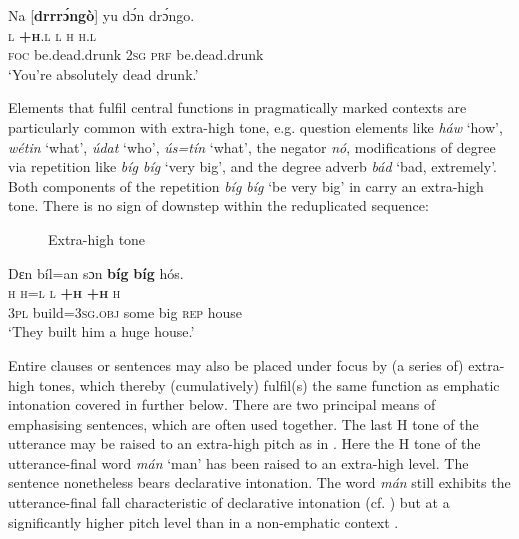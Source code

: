 \ea%
    \label{ex:key:62}
    \glll   Na  [\textbf{drrrɔ́ngò}]    yu  dɔ́n  drɔ́ngo. \\
\textsc{l}  \textbf{\textsc{+h}}\textsc{.l}        \textsc{l}  \textsc{h}  \textsc{h.l}\\
\textsc{foc}  be.dead.drunk  \textsc{2sg}  \textsc{prf}  be.dead.drunk\\
\glt ‘You’re absolutely dead drunk.’     
\z

Elements that fulfil central functions in pragmatically marked contexts are particularly common with extra-high tone, e.g. question elements like \textit{háw} ‘how’, \textit{wétin} ‘what’, \textit{údat} ‘who’, \textit{ús=tín}  ‘what’, the negator \textit{nó}, modifications of degree via repetition like \textit{bíg bíg} ‘very big’, and the degree adverb \textit{bád} ‘bad, extremely’. Both components of the repetition \textit{bíg bíg} ‘be very big’ in   carry an extra-high tone. There is no sign of downstep within the reduplicated sequence: 

\begin{figure}
\caption{Extra-high tone}
\label{fig:key:3.24}
\end{figure}
 


\ea%
    \label{ex:key:63}
    \glll   Dɛn    bíl=an    sɔn    \textbf{bíg}  \textbf{bíg}    hós.\\
\textsc{h}    \textsc{h=l}      \textsc{l}    \textbf{\textsc{+h}}  \textbf{\textsc{+h}}    \textsc{h}\\
\textsc{3pl}    build=\textsc{3sg.obj}  some  big  \textsc{rep}    house\\
\glt ‘They built him a huge house.’    
\z

Entire clauses or sentences may also be placed under focus  by (a series of) extra-high tones, which thereby (cumulatively) fulfil(s) the same function as emphatic intonation covered in  further below. There are two principal means of emphasising sentences, which are often used together. The last H tone of the utterance may be raised to an extra-high pitch as in . Here the H tone of the utterance-final word \textit{mán} ‘man’ has been raised to an extra-high level. The sentence nonetheless bears declarative intonation. The word \textit{mán} still exhibits the utterance-final fall characteristic of declarative intonation (cf. ) but at a significantly higher pitch level than in a non-emphatic context .

